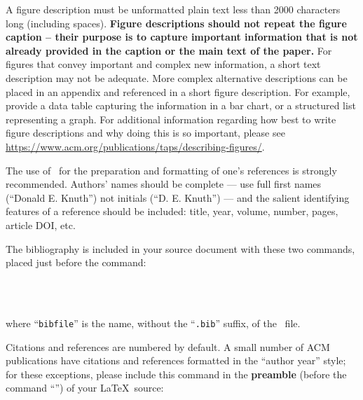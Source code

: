 A figure description must be unformatted plain text less than 2000
characters long (including spaces).  {\bfseries Figure descriptions
  should not repeat the figure caption – their purpose is to capture
  important information that is not already provided in the caption or
  the main text of the paper.} For figures that convey important and
complex new information, a short text description may not be
adequate. More complex alternative descriptions can be placed in an
appendix and referenced in a short figure description. For example,
provide a data table capturing the information in a bar chart, or a
structured list representing a graph.  For additional information
regarding how best to write figure descriptions and why doing this is
so important, please see
\url{https://www.acm.org/publications/taps/describing-figures/}.


The use of \BibTeX\ for the preparation and formatting of one's
references is strongly recommended. Authors' names should be complete
--- use full first names (``Donald E. Knuth'') not initials
(``D. E. Knuth'') --- and the salient identifying features of a
reference should be included: title, year, volume, number, pages,
article DOI, etc.

The bibliography is included in your source document with these two
commands, placed just before the \verb|| command:
\begin{verbatim}
  
  
\end{verbatim}
where ``\verb|bibfile|'' is the name, without the ``\verb|.bib|''
suffix, of the \BibTeX\ file.

Citations and references are numbered by default. A small number of
ACM publications have citations and references formatted in the
``author year'' style; for these exceptions, please include this
command in the {\bfseries preamble} (before the command
``\verb||'') of your \LaTeX\ source:
